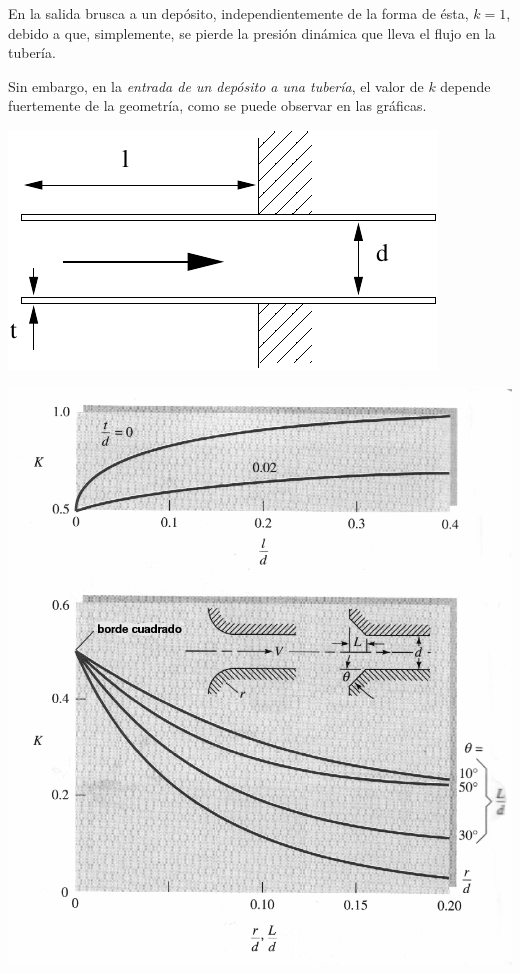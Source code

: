 \begin{minipage}{10cm}
	En la salida brusca a un depósito, independientemente de la forma de ésta, $k=1$, debido a que, simplemente, se pierde la presión dinámica que lleva el flujo en la tuber\'ia. 
	
	Sin embargo, en la \textit{entrada de un depósito a una tuber\'ia}, el valor de $k$ depende fuertemente de la geometr\'ia, como se puede observar en las gráficas.
	\medskip
	\begin{center}
		\includegraphics{TeX_files/chapter10-Tuberias/entrada_deposito.pdf}
	\end{center}
\end{minipage}
\begin{minipage}{10cm}
	\begin{center}
		\includegraphics[scale=0.5]{TeX_files/chapter10-Tuberias/k-entrada-deposito.png}
	\end{center}
\end{minipage}

